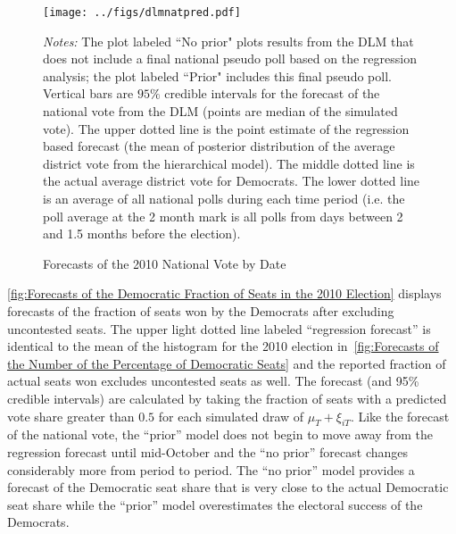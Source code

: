 \documentclass[12pt,final,fleqn]{article}
\theoremstyle{plain}
\begin{document}
\begin{figure}[!htb]
\centering
\texttt{[image: ../figs/dlmnatpred.pdf]}
\vspace{.5cm}
\caption{Forecasts of the 2010 National Vote by Date}
\label{fig:Forecasts of the 2010 National Vote by Date}
\begin{minipage}{\linewidth}
\footnotesize
\emph{Notes:} The plot labeled ``No prior" plots results from the DLM that does not include a final national pseudo poll based on the regression analysis; the plot labeled ``Prior" includes this final pseudo poll. Vertical bars are $95\%$ credible intervals for the forecast of the national vote from the DLM (points are median of the simulated vote). The upper dotted line is the point estimate of the regression based forecast (the mean of posterior distribution of the average district vote from the hierarchical model). The middle dotted line is the actual average district vote for Democrats. The lower dotted line is an average of all national polls during each time period (i.e. the poll average at the 2 month mark is all polls from days between 2 and 1.5 months before the election).
\end{minipage}
\end{figure}

\autoref{fig:Forecasts of the Democratic Fraction of Seats in the 2010 Election} displays forecasts of the fraction of seats won by the Democrats after excluding uncontested seats. The upper light dotted line labeled ``regression forecast'' is identical to the mean of the histogram for the 2010 election in~\autoref{fig:Forecasts of the Number of the Percentage of Democratic Seats} and the reported fraction of actual seats won excludes uncontested seats as well. The forecast (and 95\% credible intervals) are calculated by taking the fraction of seats with a predicted vote share greater than $0.5$ for each simulated draw of $\mu_T + \xi_{iT}$. Like the forecast of the national vote, the ``prior'' model does not begin to move away from the regression forecast until mid-October and the ``no prior'' forecast changes considerably more from period to period. The ``no prior'' model provides a forecast of the Democratic seat share that is very close to the actual Democratic seat share while the ``prior'' model overestimates the electoral success of the Democrats. 
\end{document}
